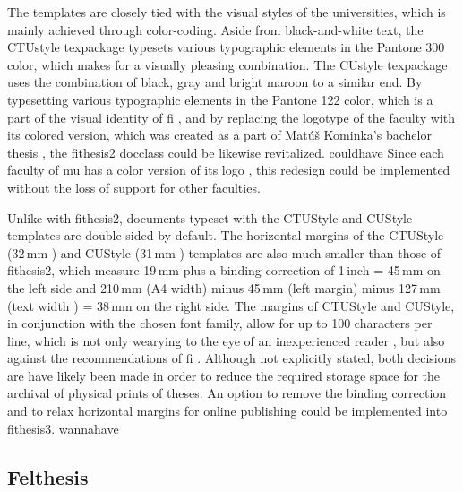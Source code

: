       The templates are closely tied with the visual styles of the universities, which is mainly achieved through color-coding. Aside from black-and-white text, the CTUstyle \gls{texpackage} typesets various typographic elements in the  Pantone 300 color, which makes for a visually pleasing combination. The CUstyle \gls{texpackage} uses the combination of black, gray and  bright maroon to a similar end. By typesetting various typographic elements in the  Pantone 122 color, which is a part of the visual identity of \gls{fi} \cite{filogo}, and by replacing the logotype of the faculty with its colored version, which was created as a part of Matúš Kominka's bachelor thesis \cite{Kominka08}, the fithesis2 \gls{docclass} could be likewise revitalized. \gls{couldhave} Since each faculty of \gls{mu} has a color version of its logo \cite{muvis}, this redesign could be implemented without the loss of support for other faculties. %

      Unlike with fithesis2, documents typeset with the CTUStyle and CUStyle templates are double-sided by default. The horizontal margins of the CTUStyle (32\,mm \cite[line 249]{ctustyleCode}) and CUStyle (31\,mm \cite[line 229]{custyleCode}) templates are also much smaller than those of fithesis2, which measure 19\,mm \cite[lines 968\nobreakdash--976]{fithesis2Code} plus a binding correction of 1\,inch \cite{latexlayout} = 45\,mm on the left side and 210\,mm (A4 width) minus 45\,mm (left margin) minus 127\,mm (text width \cite[lines~989, 1017, 1045]{fithesis2Code}) = 38\,mm on the right side. The margins of CTUStyle and CUStyle, in conjunction with the chosen font family, allow for up to 100 characters per line, which is not only wearying to the eye of an inexperienced reader%
, but also against the recommendations of \gls{fi} \cite[section 3.2.3]{bpdpfi}. Although not explicitly stated, both decisions are have likely been made in order to reduce the required storage space for the archival of physical prints of theses. An option to remove the binding correction and to relax horizontal margins for online publishing could be implemented into fithesis3. \gls{wannahave}

      \subsection{Felthesis}


